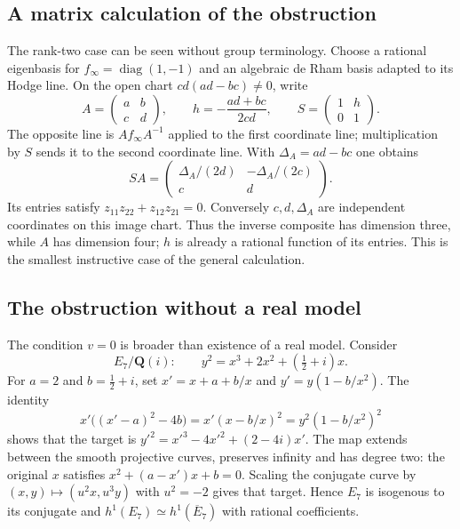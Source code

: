 \documentclass[11pt]{article}
\theoremstyle{definition}\newtheorem{definition}[theorem]{Definition}
\theoremstyle{remark}\newtheorem{remark}[theorem]{Remark}
\newcommand{\Q}{\mathbf Q}\newcommand{\Z}{\mathbf Z}
\begin{document}
\subsection*{A matrix calculation of the obstruction}
The rank-two case can be seen without group terminology. Choose a rational eigenbasis for $f_\infty=\operatorname{diag}(1,-1)$ and an algebraic de Rham basis adapted to its Hodge line. On the open chart $cd(ad-bc)\ne0$, write
\[
 A=\begin{pmatrix}a&b\\c&d\end{pmatrix},\qquad
 h=-\frac{ad+bc}{2cd},\qquad
 S=\begin{pmatrix}1&h\\0&1\end{pmatrix}.
\]
The opposite line is $Af_\infty A^{-1}$ applied to the first coordinate line; multiplication by $S$ sends it to the second coordinate line. With $\Delta_A=ad-bc$ one obtains
\[
 SA=\begin{pmatrix}\Delta_A/(2d)&-\Delta_A/(2c)\\c&d\end{pmatrix}.
\]
Its entries satisfy $z_{11}z_{22}+z_{12}z_{21}=0$. Conversely $c,d,\Delta_A$ are independent coordinates on this image chart. Thus the inverse composite has dimension three, while $A$ has dimension four; $h$ is already a rational function of its entries. This is the smallest instructive case of the general calculation.

\subsection*{The obstruction without a real model}
The condition $v=0$ is broader than existence of a real model. Consider
\[
 E_7/\Q(i):\qquad y^2=x^3+2x^2+(\tfrac12+i)x.
\]
For $a=2$ and $b=\tfrac12+i$, set $x'=x+a+b/x$ and $y'=y(1-b/x^2)$. The identity
\[
 x'\bigl((x'-a)^2-4b\bigr)=x'(x-b/x)^2
                         =y^2(1-b/x^2)^2
\]
shows that the target is $y'^2=x'^3-4x'^2+(2-4i)x'$. The map extends between the smooth projective curves, preserves infinity and has degree two: the original $x$ satisfies $x^2+(a-x')x+b=0$. Scaling the conjugate curve by $(x,y)\mapsto(u^2x,u^3y)$ with $u^2=-2$ gives that target. Hence $E_7$ is isogenous to its conjugate and $h^1(E_7)\simeq h^1(\overline E_7)$ with rational coefficients.
\end{document}
